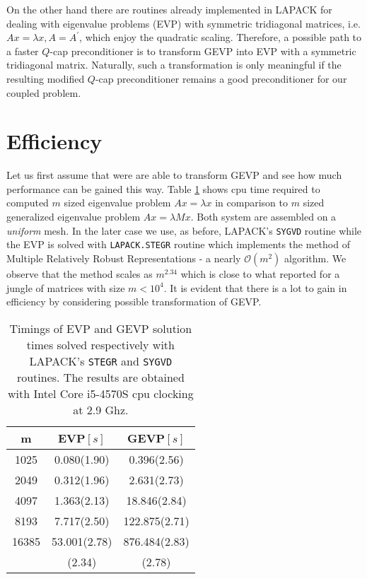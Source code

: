 \documentclass[10pt, a4paper]{article}
\newcommand{\dual}[1]{\ensuremath{{#1}^{\prime}}}
\begin{document}
On the other hand there are routines already implemented in LAPACK for dealing
with eigenvalue problems (EVP) with symmetric tridiagonal matrices, i.e.
$Ax=\lambda x, A=\dual{A}$, which enjoy the quadratic scaling. Therefore, a
possible path to a faster $Q$-cap preconditioner is to transform GEVP into EVP 
with a symmetric tridiagonal matrix. Naturally, such a transformation is only
meaningful if the resulting modified $Q$-cap preconditioner remains a good
preconditioner for our coupled problem.

\section*{Efficiency}\label{sec:eff} Let us first assume that were are able to
transform GEVP and see how much performance can be gained this way. Table
\ref{tab:evp} shows cpu time required to computed $m$ sized eigenvalue problem
$Ax=\lambda x$ in comparison to $m$ sized generalized eigenvalue problem
$Ax=\lambda M x$. Both system are assembled on a \textit{uniform} mesh. In the
later case we use, as before, LAPACK's \texttt{SYGVD} routine while the EVP is
solved with \texttt{LAPACK.STEGR} routine which implements the method of
Multiple Relatively Robust Representations \cite{mmmr} - a nearly
$\mathcal{O}(m^2)$ algorithm. We observe that the method scales as $m^{2.34}$
which is close to what \cite{demmel} reported for a jungle of matrices with size
$m<10^4$. It is evident that there is a lot to gain in efficiency by considering
possible transformation of GEVP.
\begin{table}[ht]
  \caption{Timings of EVP and GEVP solution times solved respectively with
  LAPACK's \texttt{STEGR} and \texttt{SYGVD} routines. The results are obtained
  with Intel Core i5-4570S cpu clocking at 2.9 Ghz.}
\label{tab:evp}
\footnotesize{
\begin{tabular}{c|cc}
\hline
  m & EVP$\left[s\right]$ & GEVP$\left[s\right]$\\
\hline
1025 & 0.080(1.90) & 0.396(2.56)\\
2049 & 0.312(1.96) & 2.631(2.73)\\
4097 & 1.363(2.13) & 18.846(2.84)\\
8193 & 7.717(2.50) & 122.875(2.71)\\
16385 & 53.001(2.78) & 876.484(2.83)\\
\hline
    & (2.34) & (2.78)\\
\hline
\end{tabular}
}
\end{table}
\end{document}
